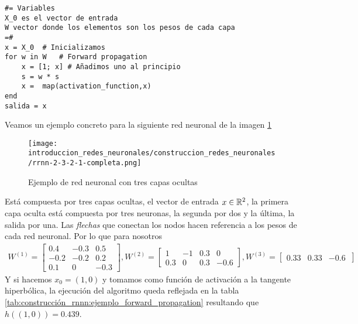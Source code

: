 \begin{verbatim}
#= Variables 
X_0 es el vector de entrada
W vector donde los elementos son los pesos de cada capa
=#
x = X_0  # Inicializamos 
for w in W   # Forward propagation
    x = [1; x] # Añadimos uno al principio
    s = w * s  
    x =  map(activation_function,x)
end
salida = x
\end{verbatim}
Veamos un ejemplo concreto para la siguiente red neuronal de la imagen \ref{img:construccion_rrnn:rrnn-2-3-2-1}
\begin{figure}[h!]
    \texttt{[image: introduccion\_redes\_neuronales/construccion\_redes\_neuronales/rrnn-2-3-2-1-completa.png]}
    \caption{Ejemplo de red neuronal con tres capas ocultas}
    \label{img:construccion_rrnn:rrnn-2-3-2-1}
\end{figure} 
Está compuesta por tres capas ocultas, el vector de entrada $x \in \mathbb{R}^2$, 
la primera capa oculta está compuesta por tres neuronas, la segunda por dos y la última, la salida por una. 
Las \textit{flechas} que conectan los nodos hacen referencia a los pesos de cada red neuronal. Por lo que para nosotros 
\begin{align}
    W^{(1)} = 
    \begin{bmatrix}
        0.4 & -0.3 & 0.5\\
        -0.2 & -0.2 & 0.2\\
        0.1 & 0 & -0.3
    \end{bmatrix} ,
    W^{(2)} = 
    \begin{bmatrix}
        1 & -1 & 0.3 & 0\\
        0.3& 0 & 0.3 & -0.6 
    \end{bmatrix} ,
    W^{(3)} = 
    \begin{bmatrix}
        0.33 & 0.33 & -0.6 \
    \end{bmatrix} 
\end{align}
Y si hacemos $x_0 = (1,0)$ y tomamos como función de activación
a la tangente hiperbólica, la ejecución del algoritmo queda reflejada en la tabla \ref{tab:construcción_rnnn:ejemplo_forward_propagation} resultando que 
$h((1,0)) = 0.439$.
